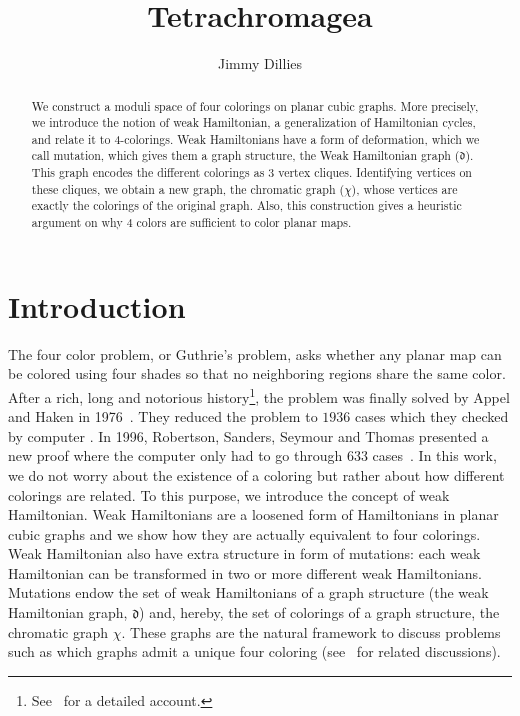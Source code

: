 \documentclass[11pt]{amsart}
\title{Tetrachromagea}
\author{Jimmy Dillies}
\date{}
\begin{document}
\begin{abstract}
\noindent We construct a moduli space of four colorings on planar cubic graphs. 
More precisely, we introduce the notion of weak Hamiltonian, a generalization of Hamiltonian cycles, and relate it to 4-colorings. 
Weak Hamiltonians have a form of deformation, which we call mutation, which gives them a graph structure, the Weak Hamiltonian graph (${\mathfrak{d}}$).
This graph encodes the different colorings as 3 vertex cliques.
Identifying vertices on these cliques, we obtain a new graph, the chromatic graph ($\chi$), whose vertices are exactly the colorings of the original graph.
Also, this construction gives a heuristic argument on why $4$ colors are sufficient to color planar maps. 
\end{abstract}

\maketitle 

\setcounter{tocdepth}{1}
\tableofcontents

\section{Introduction}

The four color problem, or Guthrie's problem, asks whether any planar map can be colored using four shades so that no neighboring regions share the same color.
After a rich, long and notorious history\footnote{See~\cite{BLW} for a detailed account.}, the problem was finally solved by Appel and Haken in 1976~\cite{AH1,AH2}.
They reduced the problem to $1936$ cases which they checked by computer . 
In 1996, Robertson, Sanders, Seymour and Thomas presented a new proof where the computer only had to go through $633$ cases~\cite{RSST}.
In this work, we do not worry about the existence of a coloring but rather about how different colorings are related.
To this purpose, we introduce the concept of weak Hamiltonian. 
Weak Hamiltonians are a loosened form of Hamiltonians in planar cubic graphs and we show how they are actually equivalent to four colorings.
Weak Hamiltonian also have extra structure in form of mutations: each weak Hamiltonian can be transformed in two or more different weak Hamiltonians. 
Mutations endow the set of weak Hamiltonians of a graph structure (the weak Hamiltonian graph, ${\mathfrak{d}}$) and, hereby, the set of colorings of a graph structure, the chromatic graph $\chi$.
These graphs are the natural framework to discuss problems such as which graphs admit a unique four coloring (see~\cite{Fow} for related discussions).
\end{document}
